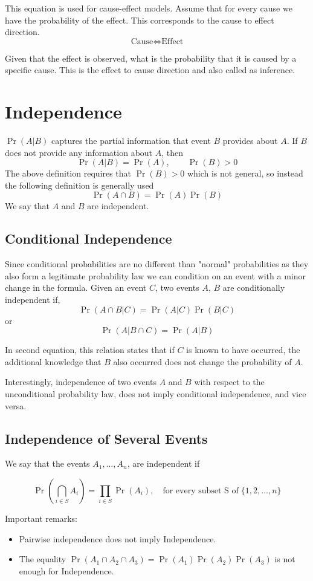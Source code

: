This equation is used for cause-effect models. Assume that for every cause we have the probability of the effect. This corresponds to the cause to effect direction. 
\[\text{Cause} \iff \text{Effect}\]

Given that the effect is observed, what is the probability that it is caused by a specific cause. This is the effect to cause direction and also called as inference.

\section{Independence}
$\Pr(A|B)$ captures the partial information that event $B$ provides about $A$. If $B$ does not provide any information about $A$, then 
\[\Pr(A|B) = \Pr(A), \quad \quad \Pr(B)>0\]
The above definition requires that $\Pr(B)>0$ which is not general, so instead the following definition is generally used
\[\boxed{\Pr(A \cap B)  =\Pr(A)\Pr(B)}\]
We say that $A$ and $B$ are independent.

\subsection{Conditional Independence}
Since conditional probabilities are no different than "normal" probabilities as they also form a legitimate probability law we can condition on an event with a minor change in the formula.
Given an event $C$, two events $A$, $B$ are conditionally independent if,
\[ \boxed{\Pr(A \cap B|C)=\Pr(A|C)\Pr(B|C)}\]
or
\[\Pr(A |B \cap C)=\Pr(A|B)\]

In second equation, this relation states that if $C$ is known to have occurred, the additional knowledge that $B$ also occurred does not change the probability of $A$.

Interestingly, independence of two events $A$ and $B$ with respect to  the unconditional probability law, does not imply conditional independence, and vice versa.

\subsection{Independence of Several Events}

We say that the events $A_1, \dots, A_n$, are independent if

\[\boxed{\Pr\left(\bigcap_{i \in S} A_i\right)=\prod_{i \in S}\Pr(A_i), \quad \text{for every subset S of} \; \{1, 2, \dots, n\} }\]

Important remarks:
\begin{itemize}
    \item Pairwise independence does not imply Independence.
    \item The equality $\Pr(A_1 \cap A_2 \cap A_3)=\Pr(A_1)\Pr(A_2)\Pr(A_3)$ is not enough for Independence.
\end{itemize}

